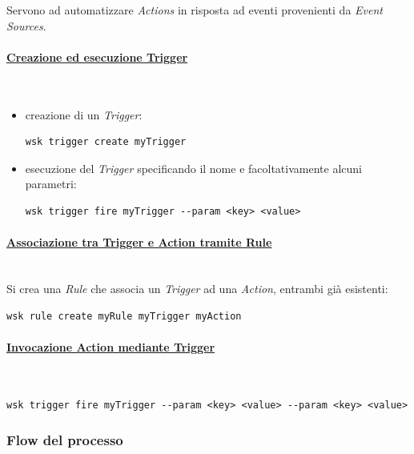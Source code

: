 \documentclass[12pt,a4paper,openany,twoside]{book}
\begin{document}
Servono ad automatizzare \textit{Actions} in risposta ad eventi provenienti da \textit{Event Sources}.

\paragraph{\underline{Creazione ed esecuzione Trigger}} ~
\begin{itemize}
    \item creazione di un \textit{Trigger}:
    \begin{lstlisting}
wsk trigger create myTrigger\end{lstlisting}
    
    \item esecuzione del \textit{Trigger} specificando il nome e facoltativamente alcuni parametri:
    \begin{lstlisting}
wsk trigger fire myTrigger --param <key> <value>\end{lstlisting}
\end{itemize}

\paragraph{\underline{Associazione tra Trigger e Action tramite Rule}} ~\\
Si crea una \textit{Rule} che associa un \textit{Trigger} ad una \textit{Action}, entrambi già esistenti:
\begin{lstlisting}
wsk rule create myRule myTrigger myAction\end{lstlisting}

\paragraph{\underline{Invocazione Action mediante Trigger}} ~
\begin{lstlisting}
wsk trigger fire myTrigger --param <key> <value> --param <key> <value>\end{lstlisting}

\subsubsection{Flow del processo}
\end{document}
